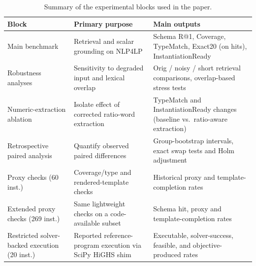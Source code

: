 \documentclass[pdflatex,sn-basic,Numbered]{sn-jnl}
\begin{document}
\begin{table}[htbp]
\centering
\caption{Summary of the experimental blocks used in the paper.}
\label{tab:exp_blocks}
\small
\begin{tabularx}{\linewidth}{X X X}
\toprule
Block & Primary purpose & Main outputs \\
\midrule
Main benchmark & Retrieval and scalar grounding on \textsc{NLP4LP} & Schema R@1, Coverage, TypeMatch, Exact20 (on hits), InstantiationReady \\
Robustness analyses & Sensitivity to degraded input and lexical overlap & Orig / noisy / short retrieval comparisons, overlap-based stress tests \\
Numeric-extraction ablation & Isolate effect of corrected ratio-word extraction & TypeMatch and InstantiationReady changes (baseline vs.\ ratio-aware extraction) \\
Retrospective paired analysis & Quantify observed paired differences & Group-bootstrap intervals, exact swap tests and Holm adjustment \\
Proxy checks (60 inst.) & Coverage/type and rendered-template checks & Historical proxy and template-completion rates \\
Extended proxy checks (269 inst.) & Same lightweight checks on a code-available subset & Schema hit, proxy and template-completion rates \\
Restricted solver-backed execution (20 inst.) & Reported reference-program execution via SciPy HiGHS shim & Executable, solver-success, feasible, and objective-produced rates \\
\bottomrule
\end{tabularx}
\end{table}
\FloatBarrier

\end{document}
